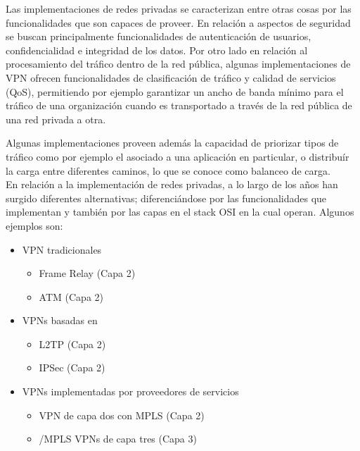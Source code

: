 Las implementaciones de redes privadas se caracterizan entre otras cosas por las funcionalidades que son capaces de proveer. En relaci\'on a aspectos de seguridad se buscan principalmente funcionalidades de autenticaci\'on de usuarios, confidencialidad e integridad de los datos. Por otro lado en relaci\'on al procesamiento del tr\'afico dentro de la red p\'ublica, algunas implementaciones de VPN ofrecen funcionalidades de clasificaci\'on de tr\'afico y calidad de servicios (QoS), permitiendo por ejemplo garantizar un ancho de banda m\'inimo para el tr\'afico de una organizaci\'on cuando es transportado a trav\'es de la red p\'ublica de una red privada a otra. 

Algunas implementaciones proveen adem\'as la capacidad de priorizar tipos de tr\'afico como por ejemplo el asociado a una aplicaci\'on en particular, o distribu\'ir la carga entre diferentes caminos, lo que se conoce como balanceo de carga.\\


En relaci\'on a la implementaci\'on de redes privadas, a lo largo de los años han surgido diferentes alternativas; diferenciándose por las funcionalidades que implementan y tambi\'en por las capas en el stack OSI en la cual operan. Algunos ejemplos son: 

\begin{itemize}
\item VPN tradicionales
	\begin{itemize}
	\item Frame Relay (Capa 2)	
	\item ATM (Capa 2)
	\end{itemize}
	
\item VPNs basadas en 
	\begin{itemize}
	\item L2TP (Capa 2)
	\item IPSec (Capa 2)
	\end{itemize}
	
\item VPNs implementadas por proveedores de servicios
	\begin{itemize}
	\item VPN de capa dos con MPLS (Capa 2)
	\item {}/MPLS VPNs de capa tres (Capa 3)
	\end{itemize}
\end{itemize}

